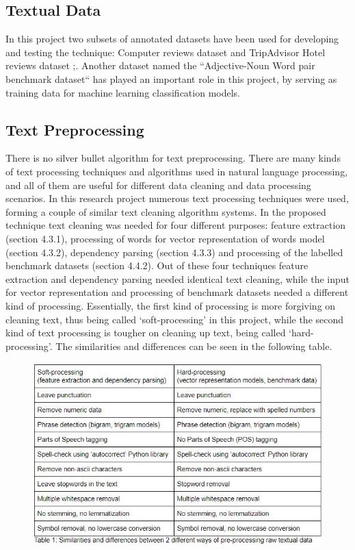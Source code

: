 \documentclass{sig-alternate}
\begin{document}
\subsection{Textual Data}
In this project two subsets of annotated datasets have been used for developing and testing the technique: Computer reviews dataset\cite{HuLiu2004} and TripAdvisor Hotel reviews dataset \cite{WangLuZhai2010};\cite{WangLuZhai2011}. Another dataset named the ``Adjective-Noun Word pair benchmark dataset``\cite{BorthJiChenBreuelChang2013} has played an important role in this project, by serving as training data for machine learning classification models.

\subsection{Text Preprocessing}
There is no silver bullet algorithm for text preprocessing. There are many kinds of text processing techniques and algorithms used in natural language processing, and all of them are useful for different data cleaning and data processing scenarios. In this research project numerous text processing techniques were used, forming a couple of similar text cleaning algorithm systems. 
In the proposed technique text cleaning was needed for four different purposes: feature extraction (section 4.3.1), processing of words for vector representation of words model (section 4.3.2), dependency parsing (section 4.3.3) and processing of the labelled benchmark datasets (section 4.4.2). Out of these four techniques feature extraction and dependency parsing needed identical text cleaning, while the input for vector representation and processing of benchmark datasets needed a different kind of processing. Essentially, the first kind of processing is more forgiving on cleaning text, thus being called `soft-processing' in this project, while the second kind of text processing is tougher on cleaning up text, being called `hard-processing'. The similarities and differences can be seen in the following table.

\begin{figure}
\centering
\includegraphics[scale=0.65]{images/text_processing_table.JPG}
\end{figure}
\end{document}
